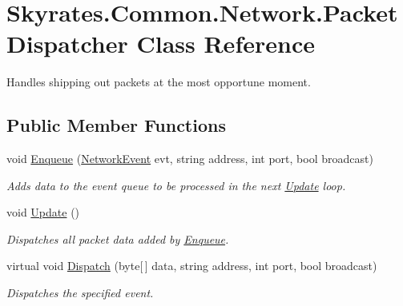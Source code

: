 \hypertarget{class_skyrates_1_1_common_1_1_network_1_1_packet_dispatcher}{\section{Skyrates.\-Common.\-Network.\-Packet\-Dispatcher Class Reference}
\label{class_skyrates_1_1_common_1_1_network_1_1_packet_dispatcher}
}


Handles shipping out packets at the most opportune moment.  


\subsection*{Public Member Functions}
\begin{DoxyCompactItemize}
\item 
void \hyperlink{class_skyrates_1_1_common_1_1_network_1_1_packet_dispatcher_a27c614744c8706259d846b8fac24915a}{Enqueue} (\hyperlink{class_skyrates_1_1_common_1_1_network_1_1_event_1_1_network_event}{Network\-Event} evt, string address, int port, bool broadcast)
\begin{DoxyCompactList}\small\item\em Adds data to the event queue to be processed in the next \hyperlink{class_skyrates_1_1_common_1_1_network_1_1_packet_dispatcher_a910470f183234eae492e621c9dbdd3fd}{Update} loop. \end{DoxyCompactList}\item 
void \hyperlink{class_skyrates_1_1_common_1_1_network_1_1_packet_dispatcher_a910470f183234eae492e621c9dbdd3fd}{Update} ()
\begin{DoxyCompactList}\small\item\em Dispatches all packet data added by \hyperlink{class_skyrates_1_1_common_1_1_network_1_1_packet_dispatcher_a27c614744c8706259d846b8fac24915a}{Enqueue}. \end{DoxyCompactList}\item 
virtual void \hyperlink{class_skyrates_1_1_common_1_1_network_1_1_packet_dispatcher_a6a6ee829c5387df7cf4a9887b5011e27}{Dispatch} (byte\mbox{[}$\,$\mbox{]} data, string address, int port, bool broadcast)
\begin{DoxyCompactList}\small\item\em Dispatches the specified event. \end{DoxyCompactList}\end{DoxyCompactItemize}


